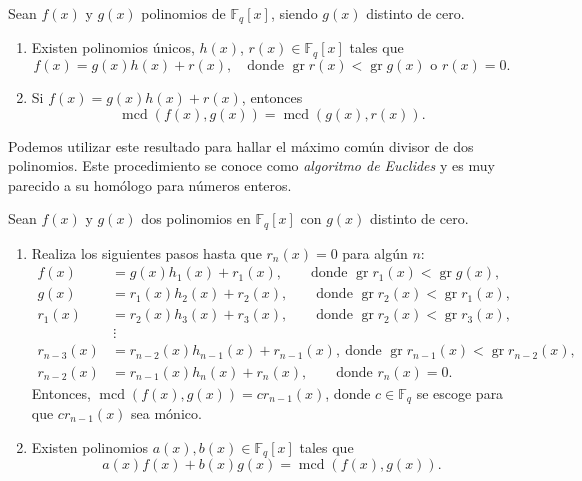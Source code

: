 

\begin{theorem}
  \label{th:algoritmo-division}
  Sean \(f(x)\) y \(g(x)\) polinomios de \(\mathbb F_q[x]\), siendo \(g(x)\) distinto de cero.
  \begin{enumerate}
    \item \label{thi:algoritmo-division-division} Existen polinomios únicos, \(h(x)\), \(r(x) \in \mathbb F_q[x]\) tales que \[
      f(x) = g(x)h(x) + r(x), \quad \text{donde } \operatorname{gr} r(x) < \operatorname{gr} g(x) \text{ o } r(x) = 0. 
    \]
    \item \label{thi:algoritmo-division-mcd} Si \(f(x) = g(x)h(x) + r(x)\), entonces \[\operatorname{mcd}(f(x), g(x)) = \operatorname{mcd}(g(x), r(x)).\]
  \end{enumerate}
\end{theorem}

Podemos utilizar este resultado para hallar el máximo común divisor de dos polinomios.
Este procedimiento se conoce como \textit{algoritmo de Euclides} y es muy parecido a su homólogo para números enteros.

\begin{theorem}
  Sean \(f(x)\) y \(g(x)\) dos polinomios en \(\mathbb F_q[x]\) con \(g(x)\) distinto de cero.
  \begin{enumerate}
    \item Realiza los siguientes pasos hasta que \(r_n(x) = 0\) para algún \(n\):
    \begin{align*}
      f(x) &= g(x)h_1(x) + r_1(x), \qquad \text{donde } \operatorname{gr} r_1(x) < \operatorname{gr} g(x),\\
      g(x) &= r_1(x)h_2(x) + r_2(x), \qquad \text{donde } \operatorname{gr} r_2(x) < \operatorname{gr} r_1(x),\\
      r_1(x) &= r_2(x)h_3(x) + r_3(x), \qquad \text{donde } \operatorname{gr} r_2(x) < \operatorname{gr} r_3(x),\\
        &\,\vdots \\
      r_{n-3}(x) &= r_{n-2}(x)h_{n-1}(x) + r_{n-1}(x), \ \text{donde } \operatorname{gr} r_{n-1}(x) < \operatorname{gr} r_{n-2}(x),\\
      r_{n-2}(x) &= r_{n-1}(x)h_n(x) + r_n(x), \qquad \text{donde } r_n(x) = 0.
    \end{align*} 
    Entonces, \(\operatorname{mcd}(f(x), g(x)) = cr_{n-1}(x)\), donde \(c \in \mathbb F_q\) se escoge para que \(cr_{n-1}(x)\) sea mónico.
    \item Existen polinomios \(a(x), b(x) \in \mathbb F_q[x]\) tales que 
    \[
      a(x)f(x) + b(x)g(x) = \operatorname{mcd}(f(x), g(x)).
    \]
  \end{enumerate}
\end{theorem}

